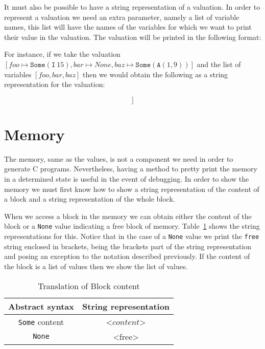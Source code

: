 It must also be possible to have a string representation of a valuation.
In order to represent a valuation we need an extra parameter, namely a list of variable names, this list will have the names of the variables for which we want to print their value in the valuation.
The valuation will be printed in the following format:
\begin{equation*}
[<vname_0> = <value_0>, <vname_1> = <value_1>, \dots, <vname_n> = <value_n>]
\end{equation*}

For instance, if we take the valuation $[foo \mapsto \mathtt{Some}(\mathtt{I}\ 15), bar \mapsto None, baz \mapsto \mathtt{Some}(\mathtt{A}(1,9))]$ and the list of variables $[foo, bar, baz]$ then we would obtain the following as a string representation for the valuation:

\begin{equation*}
[foo\ =\ 15,\ bar\ =\ ?,\ baz\ =\ 1[9]]
\end{equation*}


\section{Memory}\label{section:pretty_memory}

The memory, same as the values, is not a component we need in order to generate C programs.
Nevertheless, having a method to pretty print the memory in a determined state is useful in the event of debugging.
In order to show the memory we must first know how to show a string representation of the content of a block and a string representation of the whole block.

When we access a block in the memory we can obtain either the content of the block or a \verb|None| value indicating a free block of memory.
Table~\ref{tab:pretty_block_content} shows the string representations for this.
Notice that in the case of a \verb|None| value we print the \verb|free| string enclosed in brackets, being the brackets part of the string representation and posing an exception to the notation described previously.
If the content of the block is a list of values then we show the list of values.

\begin{table}[h!]
\centering
\begin{tabular}{|c|c|}
  \hline
  \textbf{Abstract syntax} & \textbf{String representation} \\ [0.5ex]
  \hline \hline
  \verb|Some| content & <$content$> \\
  \verb|None| & <free> \\
  \hline
\end{tabular}

\caption{Translation of Block content}
\label{tab:pretty_block_content}
\end{table}

